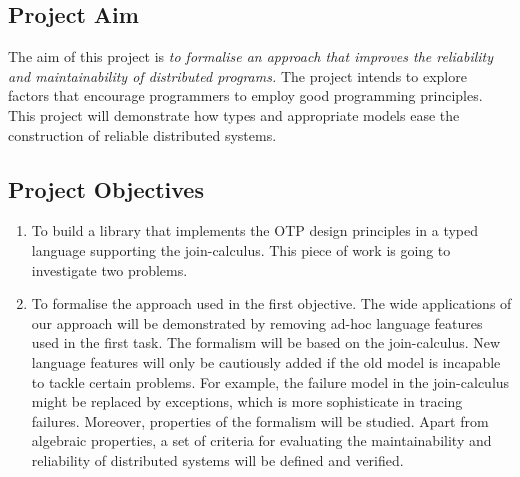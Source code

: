 \subsection{Project Aim}
The aim of this project is {\it{to formalise an approach that improves the reliability and maintainability of distributed programs.}}   The project intends to explore factors that encourage programmers to employ good programming principles.  This project will demonstrate how types and appropriate models ease the construction of reliable distributed systems.

\subsection{Project Objectives}
\label{objectives}

\begin{enumerate}
  \item To build a library that implements the OTP design principles in a typed language supporting the join-calculus.  This piece of work is going to investigate two problems.  
  \item To formalise the approach used in the first objective.  The wide applications of our approach will be demonstrated by removing ad-hoc language features used in the first task.  The formalism will be based on the join-calculus.  New language features will only be cautiously added if the old model is incapable to tackle certain problems.  For example, the failure model in the join-calculus might be replaced by exceptions, which is more sophisticate in tracing failures.  Moreover, properties of the formalism will be studied.  Apart from algebraic properties, a set of criteria for evaluating the maintainability and reliability of distributed systems will be defined and verified.

\end{enumerate}
